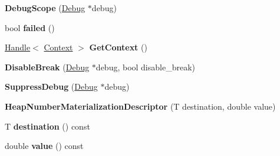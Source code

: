 \begin{DoxyCompactItemize}
\item 
\hypertarget{classv8_1_1internal_1_1_b_a_s_e___e_m_b_e_d_d_e_d_a5208011644f2b508e9492ed7a3a978f5}{}{\bfseries Debug\+Scope} (\hyperlink{classv8_1_1internal_1_1_debug}{Debug} $\ast$debug)\label{classv8_1_1internal_1_1_b_a_s_e___e_m_b_e_d_d_e_d_a5208011644f2b508e9492ed7a3a978f5}

\item 
\hypertarget{classv8_1_1internal_1_1_b_a_s_e___e_m_b_e_d_d_e_d_a38e784e404590942d2dbd3033fda86fc}{}bool {\bfseries failed} ()\label{classv8_1_1internal_1_1_b_a_s_e___e_m_b_e_d_d_e_d_a38e784e404590942d2dbd3033fda86fc}

\item 
\hypertarget{classv8_1_1internal_1_1_b_a_s_e___e_m_b_e_d_d_e_d_a24e5e3e91e4c67eff6a1dda3dd95ec6d}{}\hyperlink{classv8_1_1internal_1_1_handle}{Handle}$<$ \hyperlink{classv8_1_1internal_1_1_context}{Context} $>$ {\bfseries Get\+Context} ()\label{classv8_1_1internal_1_1_b_a_s_e___e_m_b_e_d_d_e_d_a24e5e3e91e4c67eff6a1dda3dd95ec6d}

\item 
\hypertarget{classv8_1_1internal_1_1_b_a_s_e___e_m_b_e_d_d_e_d_a04f9303b830ae5fb0635b9cedce09676}{}{\bfseries Disable\+Break} (\hyperlink{classv8_1_1internal_1_1_debug}{Debug} $\ast$debug, bool disable\+\_\+break)\label{classv8_1_1internal_1_1_b_a_s_e___e_m_b_e_d_d_e_d_a04f9303b830ae5fb0635b9cedce09676}

\item 
\hypertarget{classv8_1_1internal_1_1_b_a_s_e___e_m_b_e_d_d_e_d_ae816836ce78f209bf4a468993cb777a2}{}{\bfseries Suppress\+Debug} (\hyperlink{classv8_1_1internal_1_1_debug}{Debug} $\ast$debug)\label{classv8_1_1internal_1_1_b_a_s_e___e_m_b_e_d_d_e_d_ae816836ce78f209bf4a468993cb777a2}

\item 
\hypertarget{classv8_1_1internal_1_1_b_a_s_e___e_m_b_e_d_d_e_d_a45e9294caadc0a7ae09a11f426b28d1f}{}{\bfseries Heap\+Number\+Materialization\+Descriptor} (T destination, double value)\label{classv8_1_1internal_1_1_b_a_s_e___e_m_b_e_d_d_e_d_a45e9294caadc0a7ae09a11f426b28d1f}

\item 
\hypertarget{classv8_1_1internal_1_1_b_a_s_e___e_m_b_e_d_d_e_d_aea595d6aa92c4ee8759a1318762e3bde}{}T {\bfseries destination} () const \label{classv8_1_1internal_1_1_b_a_s_e___e_m_b_e_d_d_e_d_aea595d6aa92c4ee8759a1318762e3bde}

\item 
\hypertarget{classv8_1_1internal_1_1_b_a_s_e___e_m_b_e_d_d_e_d_ac7556c4065978ceb5d2d7442aae4e82e}{}double {\bfseries value} () const \label{classv8_1_1internal_1_1_b_a_s_e___e_m_b_e_d_d_e_d_ac7556c4065978ceb5d2d7442aae4e82e}


\end{DoxyCompactItemize}
